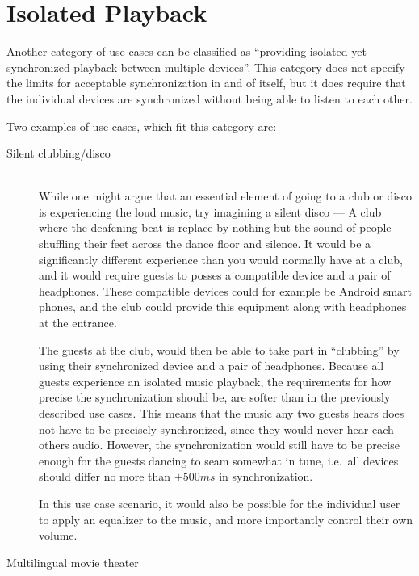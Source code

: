 \section{Isolated Playback}
Another category of use cases can be classified as \enquote{providing isolated yet synchronized playback between multiple devices}.
This category does not specify the limits for acceptable synchronization in and of itself, but it does require that the individual devices are synchronized without being able to listen to each other.

Two examples of use cases, which fit this category are:
\begin{description}
    \item[Silent clubbing/disco] \hfill\\
        While one might argue that an essential element of going to a club or disco is experiencing the loud music, try imagining a silent disco ---
        A club where the deafening beat is replace by nothing but the sound of people shuffling their feet across the dance floor and silence.
        It would be a significantly different experience than you would normally have at a club, and it would require guests to posses a compatible device and a pair of headphones.
        These compatible devices could for example be Android smart phones, and the club could provide this equipment along with headphones at the entrance.

        The guests at the club, would then be able to take part in \enquote{clubbing} by using their synchronized device and a pair of headphones.
        Because all guests experience an isolated music playback, the requirements for how precise the synchronization should be, are softer than in the previously described use cases.
        This means that the music any two guests hears does not have to be precisely synchronized, since they would never hear each others audio.
        However, the synchronization would still have to be precise enough for the guests dancing to seam somewhat in tune, i.e.~all devices should differ no more than $\pm 500 ms$ in synchronization.

        In this use case scenario, it would also be possible for the individual user to apply an equalizer to the music, and more importantly control their own volume.
    \item[Multilingual movie theater] \hfill\\
\end{description}


